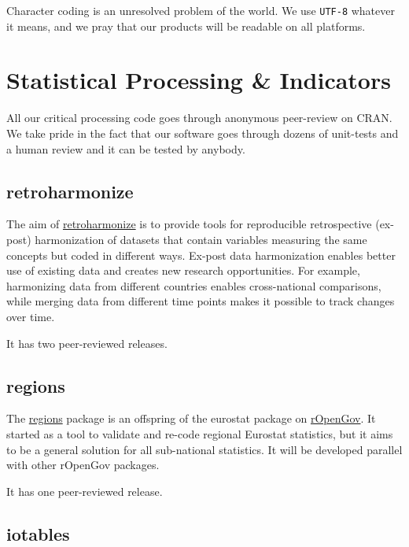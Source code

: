 \documentclass[
  fontsize=13pt,
  english,
  a4paper,
  openany, a4paper, oneside]{book}
\begin{document}
Character coding is an unresolved problem of the world. We use \texttt{UTF-8} whatever it means, and we pray that our products will be readable on all platforms.

\hypertarget{statistical-software}{%
\section{Statistical Processing \& Indicators}\label{statistical-software}}

All our critical processing code goes through anonymous peer-review on CRAN. We take pride in the fact that our software goes through dozens of unit-tests and a human review and it can be tested by anybody.

\hypertarget{retroharmonize}{%
\subsection{retroharmonize}\label{retroharmonize}}

The aim of \href{https://reprex.nl/software/retroharmonize/}{retroharmonize} is to provide tools for reproducible retrospective (ex-post) harmonization of datasets that contain variables measuring the same concepts but coded in different ways. Ex-post data harmonization enables better use of existing data and creates new research opportunities. For example, harmonizing data from different countries enables cross-national comparisons, while merging data from different time points makes it possible to track changes over time. \citep{R-retroharmonize}

It has two peer-reviewed releases.

\hypertarget{regions}{%
\subsection{regions}\label{regions}}

The \href{https://reprex.nl/software/regions/}{regions} package is an offspring of the eurostat package on \href{https://github.com/rOpenGov}{rOpenGov}. It started as a tool to validate and re-code regional Eurostat statistics, but it aims to be a general solution for all sub-national statistics. It will be developed parallel with other rOpenGov packages. \citep{R-regions}

It has one peer-reviewed release.

\hypertarget{iotables}{%
\subsection{iotables}\label{iotables}}
\end{document}
